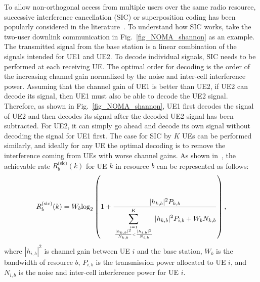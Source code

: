 To allow non-orthogonal access from multiple users over the same radio resource, successive interference cancellation (SIC) 
or superposition coding has been popularly considered in the literature~\cite{cite_docomo1,cite_docomo2,cite_docomo3}.
To understand how SIC works, take the two-user downlink communication in Fig.~\ref{fig_NOMA_shannon} as an example. The transmitted signal from the base station is a linear combination of the signals intended for UE1 and UE2. To decode individual signals, SIC needs to be performed at
each receiving UE. 
The optimal order for decoding is the order of the increasing channel gain normalized by the noise and inter-cell interference power. 
Assuming that the channel gain of UE1 is better than UE2, if UE2 can decode its signal, then UE1 must also be able to decode the UE2 signal.
Therefore, as shown in Fig.~\ref{fig_NOMA_shannon}, UE1 first decodes the signal of UE2 and then decodes its signal after the decoded
UE2 signal has been subtracted. 
For UE2, it can simply go ahead and decode its own signal without decoding the signal for UE1 first.
The case for SIC by $K$ UEs can be performed similarly, and ideally for any UE
the optimal decoding is to remove the interference coming from UEs with worse channel gains.
As shown in~\cite{cite_docomo1}, 
the achievable rate $R_b^{\text{(sic)}}(k)$ for UE $k$ in resource $b$ can be represented as follows:
\begin{equation}
\label{eq_sic_shannon}
R_b^{\text{(sic)}}(k)=W_b \text{log}_2 \left(1+\frac{|h_{k, b}|^2 P_{k, b}}{\displaystyle\sum^K_{{i=1} \atop {\frac{|h_{k, b}|^2}{N_{k, b}} < \frac{|h_{i, b}|^2}{N_{i, b}}}} |h_{k, b}|^2 P_{i, b} +W_b N_{k, b}} \right),
\end{equation}
where $|h_{i, b}|^2$ is channel gain between UE $i$ and the base station, $W_b$ is the bandwidth of resource $b$, $P_{i, b}$ is the transmission power allocated to UE $i$, and $N_{i, b}$ is the noise and inter-cell interference power for UE $i$.


